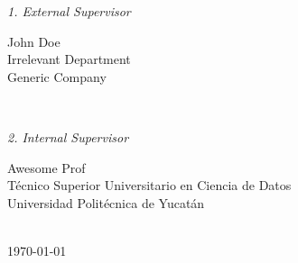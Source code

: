 \begin{titlepage}
	\vfill
	\begin{minipage}[t]{.27\textwidth}
		\raggedleft
		\textit{1. External Supervisor}
	\end{minipage}
	\hspace*{15pt}
	\begin{minipage}[t]{.65\textwidth}
		{\Large John Doe} \\
	  	{\small Irrelevant Department} \\[-1mm]
		{\small Generic Company}
	\end{minipage} \\[5mm]
	\begin{minipage}[t]{.27\textwidth}
		\raggedleft
		\textit{2. Internal Supervisor}
	\end{minipage}
	\hspace*{15pt}
	\begin{minipage}[t]{.65\textwidth}
		{\Large Awesome Prof} \\
	  	{\small Técnico Superior Universitario en Ciencia de Datos} \\[-1mm]
		{\small Universidad Politécnica de Yucatán}
	\end{minipage} \\[10mm]

	\today \\

\end{titlepage}
